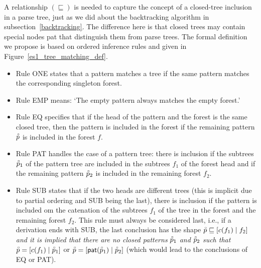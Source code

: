 A relationship \((\sqsubseteq)\) is needed to capture the concept of a
closed\hyp{}tree inclusion in a parse tree, just as we did about the
backtracking algorithm in sub\-section~\ref{backtracking}. The
difference here is that closed trees may contain special nodes
\textsf{pat} that distinguish them from parse trees. The formal
definition we propose is based on ordered inference rules and given in
Figure~\ref{es1_tree_matching_def}.
\begin{itemize}

  \item Rule \textsf{ONE} states that a pattern matches a tree if the
    same pattern matches the corresponding singleton forest.

  \item Rule \textsf{EMP} means: `The empty pattern always matches the
    empty forest.'

  \item Rule \textsf{EQ} specifies that if the head of the pattern and
    the forest is the same closed tree, then the pattern is included
    in the forest if the remaining pattern \(\accentset{\circ}{p}\) is included
    in the forest \(f\).

  \item Rule \textsf{PAT} handles the case of a pattern tree: there is
    inclusion if the subtrees \(\accentset{\circ}{p}_1\) of the pattern tree are
    included in the subtrees \(f_1\) of the forest head and if the
    remaining pattern \(\accentset{\circ}{p}_2\) is included in the remaining
    forest \(f_2\).

  \item Rule \textsf{SUB} states that if the two heads are different
    trees (this is implicit due to partial ordering and \textsf{SUB}
    being the last), there is inclusion if the pattern is included om
    the catenation of the subtrees \(f_1\) of the tree in the forest
    and the remaining forest \(f_2\). This rule must always be
    considered last, i.e., if a derivation ends with \textsf{SUB}, the
    last conclusion has the shape \(\accentset{\circ}{p} \sqsubseteq
    [{c(f_1)}\mid{f_2}]\) \emph{and it is implied that there are no
      closed patterns} \(\accentset{\circ}{p}_1\) \emph{and} \(\accentset{\circ}{p}_2\)
    \emph{such that} \(\accentset{\circ}{p} = [{c(f_1)}\mid{\accentset{\circ}{p}_1}]\) or
    \(\accentset{\circ}{p} = [{\textsf{pat}(\accentset{\circ}{p}_1)}\mid{\accentset{\circ}{p}_2}]\) (which would
    lead to the conclusions of \textsf{EQ} or \textsf{PAT}).

\end{itemize}
